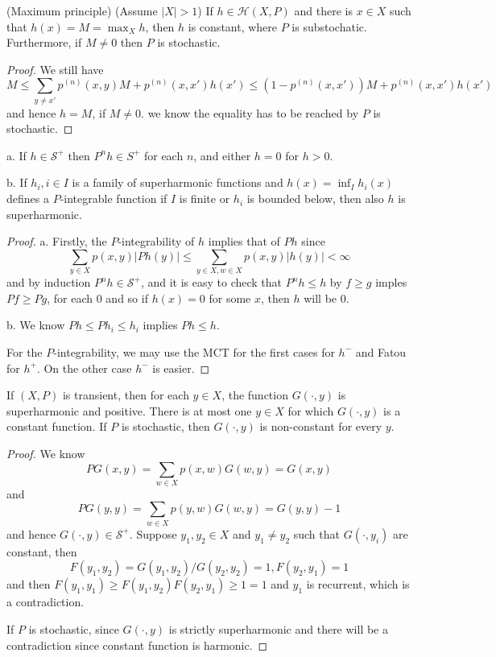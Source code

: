\documentclass[lang=en, color=blue, ]{elegantbook}
\newcommand{\Har}{\mathcal{H}}
\newcommand{\Sar}{\mathcal{S}}
\begin{document}
\begin{lemma}
    (Maximum principle) (Assume $|X| > 1$) If $h\in\Har(X,P)$ and there is $x\in X$ such that $h(x) = M = \max_X h$, then $h$ is constant, where $P$ is substochatic. Furthermore, if $M\neq 0$ then $P$ is stochastic.
\end{lemma}
\begin{proof}
    We still have
    \[
    M \leq \sum\limits_{y\neq x'}p^{(n)}(x,y)M + p^{(n)}(x,x')h(x') \leq (1-p^{(n)}(x,x'))M + p^{(n)}(x,x')h(x')
    \]
    and hence $h = M$, if $M\neq 0$. we know the equality has to be reached by $P$ is stochastic.
\end{proof}

\begin{lemma}
    a. If $h\in \Sar^+$ then $P^nh\in S^+$ for each $n$, and either $h = 0$ for $h>0$.\par
    b. If $h_i, i\in I$ is a family of superharmonic functions and $h(x) = \inf_Ih_i(x)$ defines a $P$-integrable function if $I$ is finite or $h_i$ is bounded below, then also $h$ is superharmonic.
\end{lemma}
\begin{proof}
    a. Firstly, the $P$-integrability of $h$ implies that of $Ph$ since
    \[
    \sum\limits_{y\in X}p(x,y)|Ph(y)| \leq \sum\limits_{y\in X, w\in X}p(x,y)|h(y)| < \infty
    \]
    and by induction $P^n h \in \Sar^+$, and it is easy to check that $P^n h \leq h$ by $f\geq g$ imples $Pf\geq Pg$, for each $0$ and so if $h(x) = 0$ for some $x$, then $h$ will be $0$.\par
    b. We know $Ph \leq Ph_i \leq h_i$ implies $Ph\leq h$.\par
    For the $P$-integrability, we may use the MCT for the first cases for $h^-$ and Fatou for $h^+$. On the other case $h^-$ is easier.
\end{proof}

\begin{lemma}
    If $(X,P)$ is transient, then for each $y\in X$, the function $G(\cdot,y)$ is superharmonic and positive. There is at most one $y\in X$ for which $G(\cdot,y)$ is a constant function. If $P$ is stochastic, then $G(\cdot,y)$ is non-constant for every $y$.
\end{lemma}
\begin{proof}
    We know
    \[
    PG(x,y) = \sum\limits_{w\in X}p(x,w)G(w,y) = G(x,y)
    \]
    and
    \[
    PG(y,y) = \sum\limits_{w\in X}p(y,w)G(w,y) = G(y,y) - 1
    \]
    and hence $G(\cdot,y) \in \Sar^+$. Suppose $y_1,y_2\in X$ and $y_1\neq y_2$ such that $G(\cdot,y_i)$ are constant, then
    \[
    F(y_1,y_2) = G(y_1,y_2)/G(y_2,y_2) = 1, F(y_2,y_1) = 1
    \]
    and then $F(y_1,y_1) \geq F(y_1,y_2)F(y_2,y_1) \geq 1 = 1$ and $y_1$ is recurrent, which is a contradiction.\par
    If $P$ is stochastic, since $G(\cdot,y)$ is strictly superharmonic and there will be a contradiction since constant function is harmonic.
\end{proof}
\end{document}
